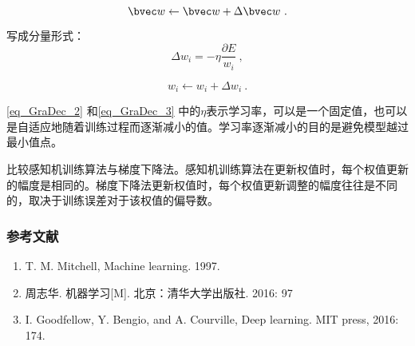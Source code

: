 \begin{equation}
\bvec w \leftarrow \bvec w + \Delta \bvec w~.
\end{equation}

写成分量形式：
\begin{equation}\label{eq_GraDec_3}
\Delta w_i = - \eta \frac{\partial E}{w_i}~,
\end{equation}

\begin{equation}
w_i \leftarrow w_i + \Delta w_i~.
\end{equation}

\autoref{eq_GraDec_2} 和\autoref{eq_GraDec_3} 中的$\eta$表示学习率，可以是一个固定值，也可以是自适应地随着训练过程而逐渐减小的值。学习率逐渐减小的目的是避免模型越过最小值点。

比较感知机训练算法与梯度下降法。感知机训练算法在更新权值时，每个权值更新的幅度是相同的。梯度下降法更新权值时，每个权值更新调整的幅度往往是不同的，取决于训练误差对于该权值的偏导数。




\subsubsection{参考文献}
\begin{enumerate}
\item T. M. Mitchell, Machine learning. 1997.
\item 周志华. 机器学习[M]. 北京：清华大学出版社. 2016: 97
\item I. Goodfellow, Y. Bengio, and A. Courville, Deep learning. MIT press, 2016: 174.
\end{enumerate}